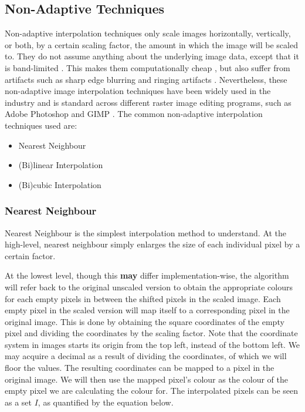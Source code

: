 \subsection{Non-Adaptive Techniques}
Non-adaptive interpolation techniques only scale images horizontally, vertically, or both, by a certain scaling factor, the amount in which the image will be scaled to. They do not assume anything about the underlying image data, except that it is band-limited \cite{depixelizingpixelart}. This makes them computationally cheap \cite{interpolationtechniquessurvey}, but also suffer from artifacts such as sharp edge blurring and ringing artifacts \cite{depixelizingpixelart}. Nevertheless, these non-adaptive image interpolation techniques have been widely used in the industry and is standard across different raster image editing programs, such as Adobe Photoshop and GIMP \cite{photoshopinterpolationmethods}\cite{gimpinterpolationmethods}. The common non-adaptive interpolation techniques used are:

\begin{itemize}
	\item Nearest Neighbour
	\item (Bi)linear Interpolation
	\item (Bi)cubic Interpolation
\end{itemize}

\subsubsection{Nearest Neighbour}
Nearest Neighbour is the simplest interpolation method to understand. At the high-level, nearest neighbour simply enlarges the size of each individual pixel by a certain factor.

At the lowest level, though this \textbf{may} differ implementation-wise, the algorithm will refer back to the original unscaled version to obtain the appropriate colours for each empty pixels in between the shifted pixels in the scaled image. Each empty pixel in the scaled version will map itself to a corresponding pixel in the original image. This is done by obtaining the square coordinates of the empty pixel and dividing the coordinates by the scaling factor. Note that the coordinate system in images starts its origin from the top left, instead of the bottom left. We may acquire a decimal as a result of dividing the coordinates, of which we will floor the values. The resulting coordinates can be mapped to a pixel in the original image. We will then use the mapped pixel's colour as the colour of the empty pixel we are calculating the colour for. The interpolated pixels can be seen as a set $I$, as quantified by the equation below.

